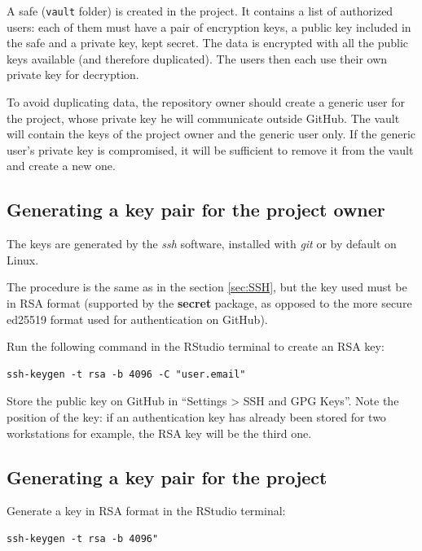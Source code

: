 \documentclass[
  12pt,
  american,
  a4paper,
  extrafontsizes,onecolumn,openright
  ]{memoir}
\begin{document}
A safe (\texttt{vault} folder) is created in the project.
It contains a list of authorized users: each of them must have a pair of encryption keys, a public key included in the safe and a private key, kept secret.
The data is encrypted with all the public keys available (and therefore duplicated).
The users then each use their own private key for decryption.

To avoid duplicating data, the repository owner should create a generic user for the project, whose private key he will communicate outside GitHub.
The vault will contain the keys of the project owner and the generic user only.
If the generic user's private key is compromised, it will be sufficient to remove it from the vault and create a new one.

\hypertarget{generating-a-key-pair-for-the-project-owner}{%
\subsection{Generating a key pair for the project owner}\label{generating-a-key-pair-for-the-project-owner}}

The keys are generated by the \emph{ssh} software, installed with \emph{git} or by default on Linux.

The procedure is the same as in the section \ref{sec:SSH}, but the key used must be in RSA format (supported by the \textbf{secret} package, as opposed to the more secure ed25519 format used for authentication on GitHub).

Run the following command in the RStudio terminal to create an RSA key:

\begin{verbatim}
ssh-keygen -t rsa -b 4096 -C "user.email"
\end{verbatim}

Store the public key on GitHub in \enquote{Settings \textgreater{} SSH and GPG Keys}.
Note the position of the key: if an authentication key has already been stored for two workstations for example, the RSA key will be the third one.

\hypertarget{generating-a-key-pair-for-the-project}{%
\subsection{Generating a key pair for the project}\label{generating-a-key-pair-for-the-project}}

Generate a key in RSA format in the RStudio terminal:

\begin{verbatim}
ssh-keygen -t rsa -b 4096" 
\end{verbatim}
\end{document}
